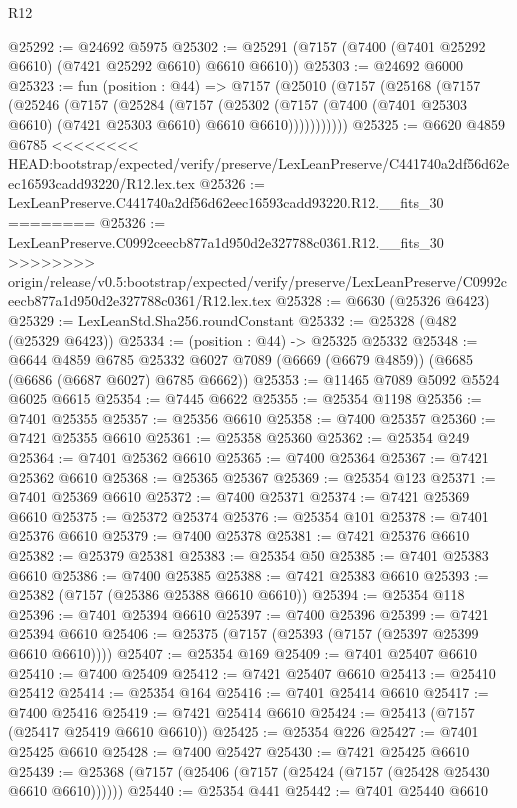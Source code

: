 \begin{lexlean}{R12}
\begin{coremodule}
{{{{{{{{{{{{{{{{{{{{{{{{{{{{{{{{{{{{{{{{{{{{{{{{{{{{{{{{{{{{{{{{{{{{{{{{{{{{{{{{{{@25292 := @24692 @5975
@25302 := @25291 (@7157 (@7400 (@7401 @25292 @6610) (@7421 @25292 @6610) @6610 @6610))
@25303 := @24692 @6000
@25323 := fun (position : @44) =>
  @7157
    (@25010
      (@7157
        (@25168
          (@7157
            (@25246
              (@7157
                (@25284
                  (@7157
                    (@25302
                      (@7157 (@7400 (@7401 @25303 @6610) (@7421 @25303 @6610) @6610 @6610)))))))))))
@25325 := @6620 @4859 @6785
<<<<<<<< HEAD:bootstrap/expected/verify/preserve/LexLeanPreserve/C441740a2df56d62eec16593cadd93220/R12.lex.tex
@25326 := LexLeanPreserve.C441740a2df56d62eec16593cadd93220.R12.__fits_30
========
@25326 := LexLeanPreserve.C0992ceecb877a1d950d2e327788c0361.R12.__fits_30
>>>>>>>> origin/release/v0.5:bootstrap/expected/verify/preserve/LexLeanPreserve/C0992ceecb877a1d950d2e327788c0361/R12.lex.tex
@25328 := @6630 (@25326 @6423)
@25329 := LexLeanStd.Sha256.roundConstant
@25332 := @25328 (@482 (@25329 @6423))
@25334 := (position : @44) -> @25325 @25332
@25348 := @6644
    @4859
    @6785
    @25332
    @6027
    @7089
    (@6669 (@6679 @4859))
    (@6685 (@6686 (@6687 @6027) @6785 @6662))
@25353 := @11465 @7089 @5092 @5524 @6025 @6615
@25354 := @7445 @6622
@25355 := @25354 @1198
@25356 := @7401 @25355
@25357 := @25356 @6610
@25358 := @7400 @25357
@25360 := @7421 @25355 @6610
@25361 := @25358 @25360
@25362 := @25354 @249
@25364 := @7401 @25362 @6610
@25365 := @7400 @25364
@25367 := @7421 @25362 @6610
@25368 := @25365 @25367
@25369 := @25354 @123
@25371 := @7401 @25369 @6610
@25372 := @7400 @25371
@25374 := @7421 @25369 @6610
@25375 := @25372 @25374
@25376 := @25354 @101
@25378 := @7401 @25376 @6610
@25379 := @7400 @25378
@25381 := @7421 @25376 @6610
@25382 := @25379 @25381
@25383 := @25354 @50
@25385 := @7401 @25383 @6610
@25386 := @7400 @25385
@25388 := @7421 @25383 @6610
@25393 := @25382 (@7157 (@25386 @25388 @6610 @6610))
@25394 := @25354 @118
@25396 := @7401 @25394 @6610
@25397 := @7400 @25396
@25399 := @7421 @25394 @6610
@25406 := @25375 (@7157 (@25393 (@7157 (@25397 @25399 @6610 @6610))))
@25407 := @25354 @169
@25409 := @7401 @25407 @6610
@25410 := @7400 @25409
@25412 := @7421 @25407 @6610
@25413 := @25410 @25412
@25414 := @25354 @164
@25416 := @7401 @25414 @6610
@25417 := @7400 @25416
@25419 := @7421 @25414 @6610
@25424 := @25413 (@7157 (@25417 @25419 @6610 @6610))
@25425 := @25354 @226
@25427 := @7401 @25425 @6610
@25428 := @7400 @25427
@25430 := @7421 @25425 @6610
@25439 := @25368 (@7157 (@25406 (@7157 (@25424 (@7157 (@25428 @25430 @6610 @6610))))))
@25440 := @25354 @441
@25442 := @7401 @25440 @6610
}}}}}}}}}}}}}}}}}}}}}}}}}}}}}}}}}}}}}}}}}}}}}}}}}}}}}}}}}}}}}}}}}}}}}}}}}}}}}}}}}}
\end{coremodule}
\end{lexlean}
